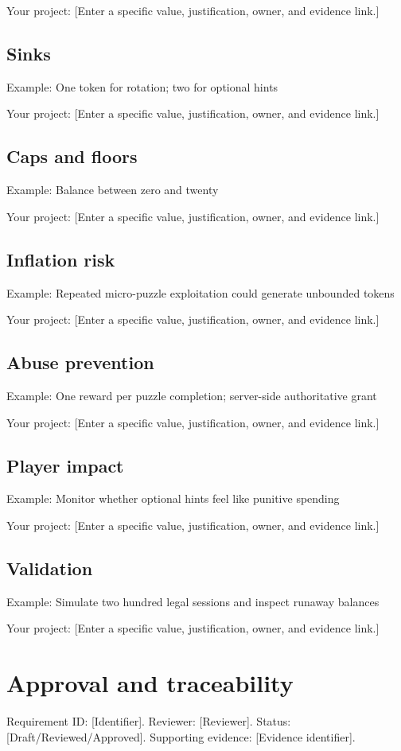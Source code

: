 \documentclass[11pt]{article}
\begin{document}
Your project: [Enter a specific value, justification, owner, and evidence link.]


\subsection{Sinks}
Example: One token for rotation; two for optional hints

Your project: [Enter a specific value, justification, owner, and evidence link.]


\subsection{Caps and floors}
Example: Balance between zero and twenty

Your project: [Enter a specific value, justification, owner, and evidence link.]


\subsection{Inflation risk}
Example: Repeated micro-puzzle exploitation could generate unbounded tokens

Your project: [Enter a specific value, justification, owner, and evidence link.]


\subsection{Abuse prevention}
Example: One reward per puzzle completion; server-side authoritative grant

Your project: [Enter a specific value, justification, owner, and evidence link.]


\subsection{Player impact}
Example: Monitor whether optional hints feel like punitive spending

Your project: [Enter a specific value, justification, owner, and evidence link.]


\subsection{Validation}
Example: Simulate two hundred legal sessions and inspect runaway balances

Your project: [Enter a specific value, justification, owner, and evidence link.]


\section{Approval and traceability}
Requirement ID: [Identifier]. Reviewer: [Reviewer]. Status: [Draft/Reviewed/Approved]. Supporting evidence: [Evidence identifier].
\end{document}
